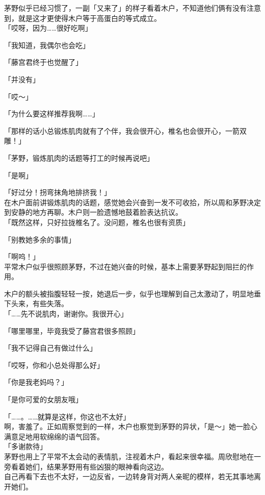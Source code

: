 茅野似乎已经习惯了，一副「又来了」的样子看着木户，不知道他们俩有没有注意到，就是这才更使得木户等于高蛋白的等式成立。\\

「哎呀，因为……很好吃啊」

「我知道，我偶尔也会吃」

「藤宫君终于也觉醒了」

「并没有」

「哎～」

「为什么要这样推荐我啊……」

「那样的话小总锻炼肌肉就有了个伴，我会很开心，椎名也会很开心，一箭双雕！」

「茅野，锻炼肌肉的话题等打工的时候再说吧」

「是啊」

「好过分！拐弯抹角地排挤我！」\\

在木户面前讲锻炼肌肉的话题，感觉她会兴奋到一发不可收拾，所以周和茅野决定到安静的地方再聊。木户则一脸遗憾地鼓着脸表达抗议。\\

「既然这样，只好拉拢椎名了。没问题，椎名也很有资质」

「别教她多余的事情」

「啊呜！」\\

平常木户似乎很照顾茅野，不过在她兴奋的时候，基本上需要茅野起到阻拦的作用。

木户的额头被指腹轻轻一按，她退后一步，似乎也理解到自己太激动了，明显地垂下头来，有些失落。\\

「……先不说肌肉，谢谢你。我很开心」

「哪里哪里，毕竟我受了藤宫君很多照顾」

「我不记得自己有做过什么」

「哎呀，你和小总处得那么好」

「你是我老妈吗？」

「是你可爱的女朋友哦」

「……。……就算是这样，你这也不太好」\\

啊，害羞了。正如周察觉到的一样，木户也察觉到茅野的异状，「是～」她一脸心满意足地用软绵绵的语气回答。\\

「多谢款待」\\

茅野也用上了平常不太会动的表情肌，注视着木户，看起来很幸福。周欣慰地在一旁看着她们，结果茅野用有些凶狠的眼神看向这边。\\

自己再看下去也不太好，一边反省，一边转身背对两人亲昵的模样，若无其事地离开她们。
